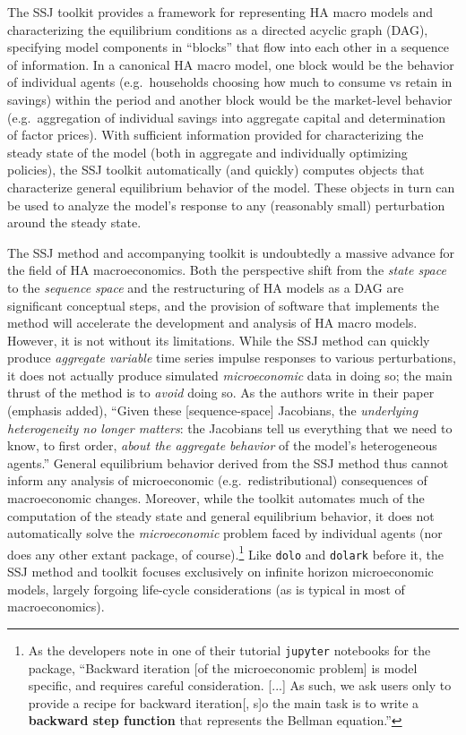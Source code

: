 \documentclass[12pt,pdftex,letterpaper]{article}
\begin{document}
The SSJ toolkit provides a framework for representing HA macro models and characterizing the equilibrium conditions as a directed acyclic graph (DAG), specifying model components in ``blocks'' that flow into each other in a sequence of information. In a canonical HA macro model, one block would be the behavior of individual agents (e.g.\ households choosing how much to consume vs retain in savings) within the period and another block would be the market-level behavior (e.g.\ aggregation of individual savings into aggregate capital and determination of factor prices). With sufficient information provided for characterizing the steady state of the model (both in aggregate and individually optimizing policies), the SSJ toolkit automatically (and quickly) computes objects that characterize general equilibrium behavior of the model. These objects in turn can be used to analyze the model's response to any (reasonably small) perturbation around the steady state.

The SSJ method and accompanying toolkit is undoubtedly a massive advance for the field of HA macroeconomics. Both the perspective shift from the \textit{state space} to the \textit{sequence space} and the restructuring of HA models as a DAG are significant conceptual steps, and the provision of software that implements the method will accelerate the development and analysis of HA macro models. However, it is not without its limitations. While the SSJ method can quickly produce \textit{aggregate variable} time series impulse responses to various perturbations, it does not actually produce simulated \textit{microeconomic} data in doing so; the main thrust of the method is to \textit{avoid} doing so. As the authors write in their paper (emphasis added), ``Given these [sequence-space] Jacobians, the \textit{underlying heterogeneity no longer matters}: the Jacobians tell us everything that we need to know, to first order, \textit{about the aggregate behavior} of the model’s heterogeneous agents.'' General equilibrium behavior derived from the SSJ method thus cannot inform any analysis of microeconomic (e.g.\ redistributional) consequences of macroeconomic changes. Moreover, while the toolkit automates much of the computation of the steady state and general equilibrium behavior, it does not automatically solve the \textit{microeconomic} problem faced by individual agents (nor does any other extant package, of course).\footnote{As the developers note in one of their tutorial \texttt{jupyter} notebooks for the package, ``Backward iteration [of the microeconomic problem] is model specific, and requires careful consideration. [...] As such, we ask users only to provide a recipe for backward iteration[, s]o the main task is to write a \textbf{backward step function} that represents the Bellman equation.''} Like \texttt{dolo} and \texttt{dolark} before it, the SSJ method and toolkit focuses exclusively on infinite horizon microeconomic models, largely forgoing life-cycle considerations (as is typical in most of macroeconomics).
\end{document}
